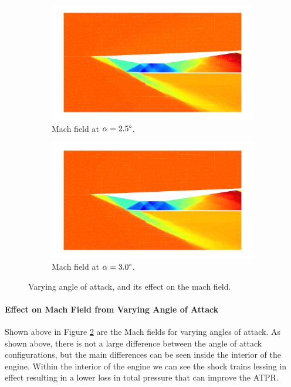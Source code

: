 \begin{figure}[h]
    \begin{subfigure}[h]{0.48\linewidth}
        \centering
        \includegraphics[width=\linewidth]{rep/q5/mach_a25.pdf}
        \caption{Mach field at $\alpha=2.5\degree$.}
    \end{subfigure}
    \begin{subfigure}[h]{0.48\linewidth}
        \centering
        \includegraphics[width=\linewidth]{rep/q5/mach_a30.pdf}
        \caption{Mach field at $\alpha=3.0\degree$.}\label{fig:mach30}
    \end{subfigure}
    \caption[Mach Field with Varying Angle of Attack]{Varying angle of attack, and its effect on the mach field.}
    \label{fig:mach_fields}
\end{figure}

\paragraph{Effect on Mach Field from Varying Angle of Attack} Shown above in Figure \ref{fig:mach_fields} are the Mach fields for varying angles of attack. As shown above, there is not a large difference between the angle of attack configurations, but the main differences can be seen inside the interior of the engine. Within the interior of the engine we can see the shock trains lessing in effect resulting in a lower loss in total pressure that can improve the ATPR.

